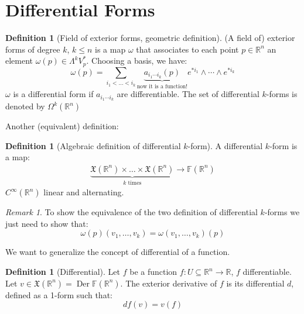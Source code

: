 \documentclass[a4paper,11pt,titlepage]{article}
\numberwithin{equation}{section}
\theoremstyle{definition}
\newtheorem{definition}[theorem]{Definition}
\theoremstyle{remark}
\newtheorem{remark}[theorem]{Remark}
\DeclareMathOperator{\Der}{Der}
\newcommand{\rfield}{\mathbb{R}}
\begin{document}
\section{Differential Forms}
\begin{definition} [Field of exterior forms, geometric definition] \label{geomkforms}
  (A field of) exterior forms of degree $k$, $k \le n$ is a map $\omega$ that associates to each point $p \in \rfield^n$ an element $\omega(p) \in \Lambda^{k}V_p^*$.
  Choosing a basis, we have:
  \begin{equation}
    \omega(p) = \sum\limits_{i_1 < \ldots < i_k} \underbrace{a_{i_1 \cdots i_k}(p)}_{\text{now it is a function!}} e^{*i_1} \wedge \cdots \wedge e^{*i_k}
    \end{equation}
    $\omega$ is a differential form if $a_{i_1 \cdots i_k}$ are differentiable. The set of differential $k$-forms is denoted by $\Omega^k(\rfield^n)$
\end{definition}

Another (equivalent) definition:

\begin{definition} [Algebraic definition of differential $k$-form] \label{algkforms}
  A differential $k$-form is a map:
  \begin{align}
    \underbrace{\mathfrak{X}(\rfield^n) \times \ldots \times \mathfrak{X}(\rfield^n)}_{k \text{ times}} \rightarrow \mathbb{F}(\rfield^n)
  \end{align}
  $C^\infty(\rfield^n)$ linear and alternating.
\end{definition}

\begin{remark}
  To show the equivalence of the two definition of differential $k$-forms we just need to show that:
  \begin{equation}
    \omega(p)(v_1, \ldots, v_k) = \omega(v_1, \ldots, v_k)(p)
  \end{equation}
\end{remark}

We want to generalize the concept of differential of a function.
\begin{definition}[Differential] \label{differential}
  Let $f$ be a function $f \colon U \subseteq \rfield^n \rightarrow \rfield$, $f$ differentiable. Let $v \in \mathfrak{X}(\rfield^n) = \Der \mathbb{F}(\rfield^n)$. The exterior derivative of $f$ is its differential $d$, defined as a 1-form such that:
  \begin{equation}
    df(v) = v(f)
  \end{equation}
\end{definition}
\end{document}
